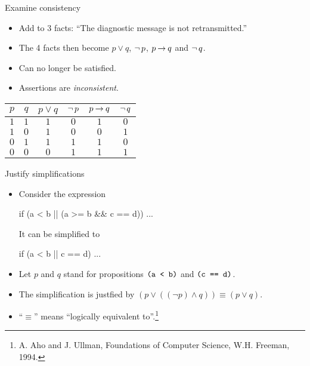 \begin{wideslide}[bm=,toc=]{Examine consistency}
\begin{itemize}
\item Add to 3 facts: ``The diagnostic message is not retransmitted.''
\item The 4 facts then become $p\lor q$, $\mathop{\neg} p$, $p\mathbin{\rightarrow} q$ and $\mathop{\neg} q$.
\item Can no longer be satisfied.
\item Assertions are {\em inconsistent\/}.
\end{itemize}
\begin{center}
\begin{tabular}{c|c||c|c|c|c}
$p$ & $q$ & $p \lor q$ & $\mathop{\neg} p$ & $p \mathbin{\rightarrow} q$ & $\mathop{\neg} q$ \\
\hline
$1$ & $1$ & $1$ & $0$ & $1$ & $0$\\
$1$ & $0$ & $1$ & $0$ & $0$ & $1$\\
$0$ & $1$ & $1$ & $1$ & $1$ & $0$\\
$0$ & $0$ & $0$ & $1$ & $1$ & $1$
\end{tabular}
\end{center}
\end{wideslide}

\begin{wideslide}[bm=,toc=]{Justify simplifications}
\begin{itemize}
\item Consider the expression
\vspace{-1em}
\begin{program}
if (a < b || (a >= b \&\& c == d)) ...
\end{program}
It can be simplified to
\vspace{-1em}
\begin{program}
if (a < b || c == d) ...
\end{program}
\item Let $p$ and $q$ stand for propositions $\mbox{\tt (a < b)}$ and $\mbox{\tt (c == d)}$.
\item The simplification is justfied by $(p\vee ((\neg p) \wedge q)) \equiv (p\vee q)$.
\item ``$\equiv$'' means ``logically equivalent to''.\footnote{
A. Aho and J. Ullman, Foundations of Computer Science, W.H. Freeman, 1994.}
\end{itemize}
\end{wideslide}

